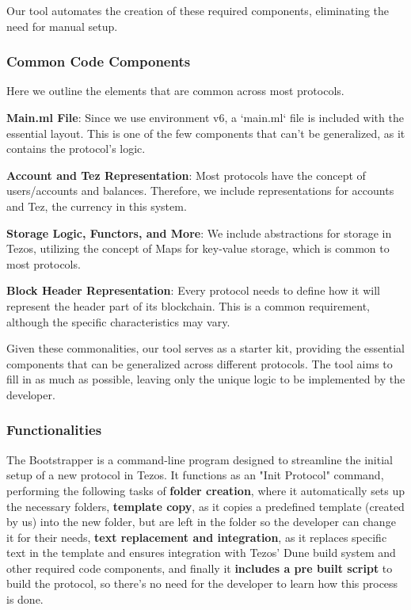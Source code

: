 Our tool automates the creation of these required components, eliminating the need for manual setup.

\subsubsection*{Common Code Components}

Here we outline the elements that are common across most protocols.

\textbf{Main.ml File}: Since we use environment v6, a `main.ml` file is included with the essential layout. This is one of the few components that can't be generalized, as it contains the protocol's logic.
  
\textbf{Account and Tez Representation}: Most protocols have the concept of users/accounts and balances. Therefore, we include representations for accounts and Tez, the currency in this system.

\textbf{Storage Logic, Functors, and More}: We include abstractions for storage in Tezos, utilizing the concept of Maps for key-value storage, which is common to most protocols.

\textbf{Block Header Representation}: Every protocol needs to define how it will represent the header part of its blockchain. This is a common requirement, although the specific characteristics may vary.

Given these commonalities, our tool serves as a starter kit, providing the essential components that can be generalized across different protocols. The tool aims to fill in as much as possible, leaving only the unique logic to be implemented by the developer.


\subsubsection*{Functionalities}
The Bootstrapper is a command-line program designed to streamline the initial setup of a new protocol in Tezos.
It functions as an "Init Protocol" command, performing the following tasks of \textbf{folder creation}, where it automatically sets up the necessary folders, \textbf{template copy}, as it copies a predefined template (created by us) into the new folder, but are left in the folder so the developer can change it for their needs, \textbf{text replacement and integration}, as it replaces specific text in the template and ensures integration with Tezos' Dune build system and other required code components, and finally it \textbf{includes a pre built script} to build the protocol, so there's no need for the developer to learn how this process is done.

